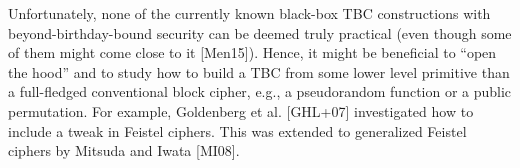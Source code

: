 \medskip{}


Unfortunately, none of the currently known black-box
TBC constructions with beyond-birthday-bound security can be deemed truly practical (even
though some of them might come close to it [Men15]). Hence, it might be beneficial to “open
the hood” and to study how to build a TBC from some lower level primitive than a full-fledged
conventional block cipher, e.g., a pseudorandom function or a public permutation. For example,
Goldenberg et al. [GHL+07] investigated how to include a tweak in Feistel ciphers. This was
extended to generalized Feistel ciphers by Mitsuda and Iwata [MI08].




